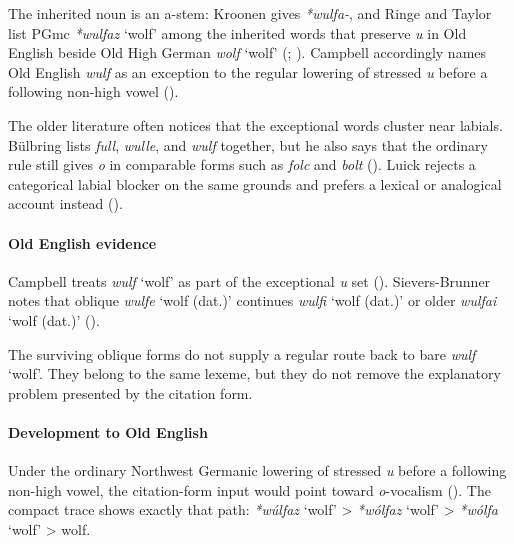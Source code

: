 \documentclass[
  british,
  a4paper,
]{article}
\providecommand{\Recon}[1]{\emph{*#1}}
\begin{document}
The inherited noun is an a-stem: Kroonen gives \emph{*wulfa-}, and Ringe
and Taylor list PGmc \Recon{wulfaz} `wolf' among the inherited words
that preserve \emph{u} in Old English beside Old High German \emph{wolf}
`wolf' (;
). Campbell
accordingly names Old English \emph{wulf} as an exception to the regular
lowering of stressed \emph{u} before a following non-high vowel
().

The older literature often notices that the exceptional words cluster
near labials. Bülbring lists \emph{full}, \emph{wulle}, and \emph{wulf}
together, but he also says that the ordinary rule still gives \emph{o}
in comparable forms such as \emph{folc} and \emph{bolt}
(). Luick rejects a
categorical labial blocker on the same grounds and prefers a lexical or
analogical account instead ().

\paragraph{Old English evidence}\label{old-english-evidence-158}

Campbell treats \emph{wulf} `wolf' as part of the exceptional \emph{u}
set ().
Sievers-Brunner notes that oblique {\emph{wulfe}} `wolf (dat.)'
continues {\emph{wulfi}} `wolf (dat.)' or older {\emph{wulfai}} `wolf
(dat.)' ().

The surviving oblique forms do not supply a regular route back to bare
\emph{wulf} `wolf'. They belong to the same lexeme, but they do not
remove the explanatory problem presented by the citation form.

\paragraph{Development to Old
English}\label{development-to-old-english-157}

Under the ordinary Northwest Germanic lowering of stressed \emph{u}
before a following non-high vowel, the citation-form input would point
toward \emph{o}-vocalism (). The compact trace shows exactly that path:
\Recon{wúlfaz} `wolf' \textgreater{} \Recon{wólfaz} `wolf'
\textgreater{} \Recon{wólfa} `wolf' \textgreater{} wolf.
\end{document}
